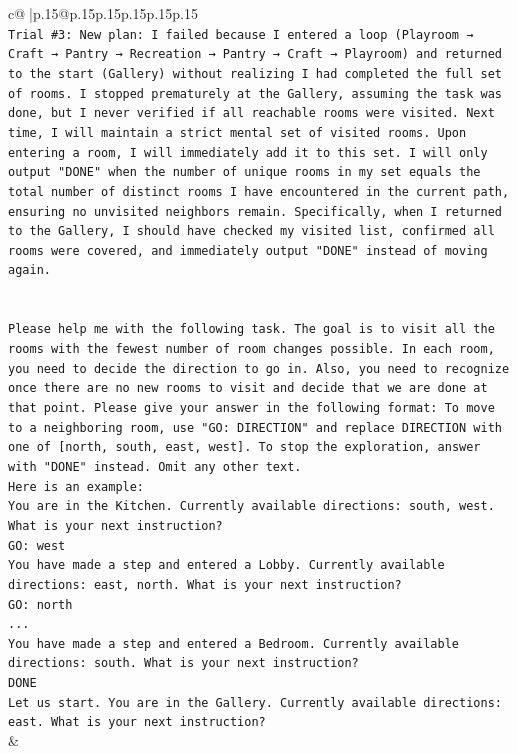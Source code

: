 \documentclass{article}
\begin{document}
{\begin{supertabular}{c@{$\;$}|p{.15\linewidth}@{}p{.15\linewidth}p{.15\linewidth}p{.15\linewidth}p{.15\linewidth}p{.15\linewidth}}
{{{\\ 
\texttt{Trial \#3: New plan: I failed because I entered a loop (Playroom → Craft → Pantry → Recreation → Pantry → Craft → Playroom) and returned to the start (Gallery) without realizing I had completed the full set of rooms. I stopped prematurely at the Gallery, assuming the task was done, but I never verified if all reachable rooms were visited. Next time, I will maintain a strict mental set of visited rooms. Upon entering a room, I will immediately add it to this set. I will only output "DONE" when the number of unique rooms in my set equals the total number of distinct rooms I have encountered in the current path, ensuring no unvisited neighbors remain. Specifically, when I returned to the Gallery, I should have checked my visited list, confirmed all rooms were covered, and immediately output "DONE" instead of moving again.} \\
\\ 
\\ 
\texttt{Please help me with the following task. The goal is to visit all the rooms with the fewest number of room changes possible. In each room, you need to decide the direction to go in. Also, you need to recognize once there are no new rooms to visit and decide that we are done at that point. Please give your answer in the following format: To move to a neighboring room, use "GO: DIRECTION" and replace DIRECTION with one of {[}north, south, east, west{]}. To stop the exploration, answer with "DONE" instead. Omit any other text.} \\
\texttt{Here is an example:} \\
\texttt{You are in the Kitchen. Currently available directions: south, west. What is your next instruction?} \\
\texttt{GO: west} \\
\texttt{You have made a step and entered a Lobby. Currently available directions: east, north. What is your next instruction?} \\
\texttt{GO: north} \\
\texttt{...} \\
\texttt{You have made a step and entered a Bedroom. Currently available directions: south. What is your next instruction?} \\
\texttt{DONE} \\
\texttt{Let us start. You are in the Gallery. Currently available directions: east. What is your next instruction?} \\
            }
        }
    }
    & \\ \\


\end{supertabular}}
\end{document}
